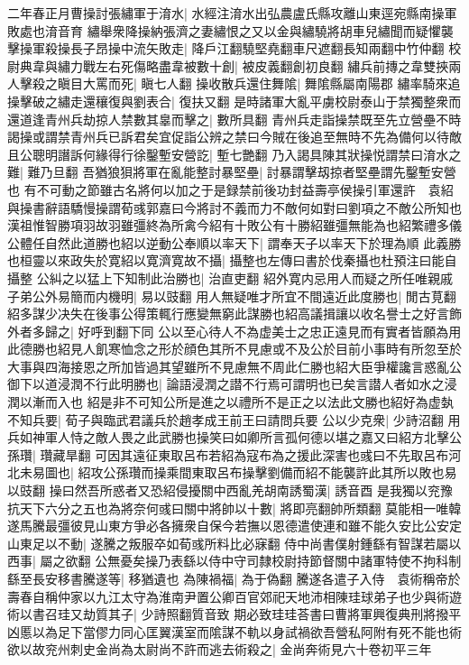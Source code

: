 二年春正月曹操討張繡軍于淯水|{
	水經注淯水出弘農盧氏縣攻離山東逕宛縣南操軍敗處也淯音育}
繡舉衆降操納張濟之妻繡恨之又以金與繡驍將胡車兒繡聞而疑懼襲擊操軍殺操長子昂操中流矢敗走|{
	降戶江翻驍堅堯翻車尺遮翻長知兩翻中竹仲翻}
校尉典韋與繡力戰左右死傷略盡韋被數十創|{
	被皮義翻創初良翻}
繡兵前摶之韋雙挾兩人擊殺之瞋目大罵而死|{
	瞋七人翻}
操收散兵還住舞隂|{
	舞隂縣屬南陽郡}
繡率騎來追操擊破之繡走還穰復與劉表合|{
	復扶又翻}
是時諸軍大亂平虜校尉泰山于禁獨整衆而還道逢青州兵劫掠人禁數其辠而擊之|{
	數所具翻}
青州兵走詣操禁既至先立營壘不時謁操或謂禁青州兵已訴君矣宜促詣公辨之禁曰今賊在後追至無時不先為備何以待敵且公聰明譖訴何緣得行徐鑿塹安營訖|{
	塹七艷翻}
乃入謁具陳其狀操悦謂禁曰淯水之難|{
	難乃旦翻}
吾猶狼狽將軍在亂能整討暴堅壘|{
	討暴謂擊刼掠者堅壘謂先鑿塹安營也}
有不可動之節雖古名將何以加之于是録禁前後功封益壽亭侯操引軍還許　袁紹與操書辭語驕慢操謂荀彧郭嘉曰今將討不義而力不敵何如對曰劉項之不敵公所知也漢祖惟智勝項羽故羽雖彊終為所禽今紹有十敗公有十勝紹雖彊無能為也紹繁禮多儀公體任自然此道勝也紹以逆動公奉順以率天下|{
	謂奉天子以率天下於理為順}
此義勝也桓靈以來政失於寛紹以寛濟寛故不攝|{
	攝整也左傳曰書於伐秦攝也杜預注曰能自攝整}
公糾之以猛上下知制此治勝也|{
	治直吏翻}
紹外寛内忌用人而疑之所任唯親戚子弟公外易簡而内機明|{
	易以豉翻}
用人無疑唯才所宜不間遠近此度勝也|{
	閒古莧翻}
紹多謀少决失在後事公得策輒行應變無窮此謀勝也紹高議揖讓以收名譽士之好言飾外者多歸之|{
	好呼到翻下同}
公以至心待人不為虚美士之忠正遠見而有實者皆願為用此德勝也紹見人飢寒恤念之形於顔色其所不見慮或不及公於目前小事時有所忽至於大事與四海接恩之所加皆過其望雖所不見慮無不周此仁勝也紹大臣爭權讒言惑亂公御下以道浸潤不行此明勝也|{
	論語浸潤之譛不行焉可謂明也已矣言譛人者如水之浸潤以漸而入也}
紹是非不可知公所是進之以禮所不是正之以法此文勝也紹好為虚埶不知兵要|{
	荀子與臨武君議兵於趙孝成王前王曰請問兵要}
公以少克衆|{
	少詩沼翻}
用兵如神軍人恃之敵人畏之此武勝也操笑曰如卿所言孤何德以堪之嘉又曰紹方北擊公孫瓚|{
	瓚藏旱翻}
可因其遠征東取呂布若紹為寇布為之援此深害也彧曰不先取呂布河北未易圖也|{
	紹攻公孫瓚而操乘間東取呂布操擊劉備而紹不能襲許此其所以敗也易以豉翻}
操曰然吾所惑者又恐紹侵擾關中西亂羌胡南誘蜀漢|{
	誘音酉}
是我獨以兖豫抗天下六分之五也為將奈何彧曰關中將帥以十數|{
	將即亮翻帥所類翻}
莫能相一唯韓遂馬騰最彊彼見山東方爭必各擁衆自保今若撫以恩德遣使連和雖不能久安比公安定山東足以不動|{
	遂騰之叛服卒如荀彧所料比必寐翻}
侍中尚書僕射鍾繇有智謀若屬以西事|{
	屬之欲翻}
公無憂矣操乃表繇以侍中守司隸校尉持節督關中諸軍特使不拘科制繇至長安移書騰遂等|{
	移猶遺也}
為陳禍福|{
	為于偽翻}
騰遂各遣子入侍　袁術稱帝於壽春自稱仲家以九江太守為淮南尹置公卿百官郊祀天地沛相陳珪球弟子也少與術遊術以書召珪又劫質其子|{
	少詩照翻質音致}
期必致珪珪荅書曰曹將軍興復典刑將撥平凶慝以為足下當僇力同心匡翼漢室而隂謀不軌以身試禍欲吾營私阿附有死不能也術欲以故兖州刺史金尚為太尉尚不許而逃去術殺之|{
	金尚奔術見六十卷初平三年}
